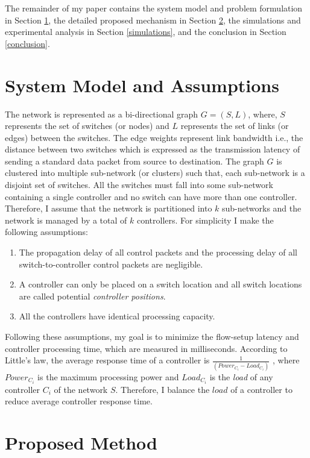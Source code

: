 \documentclass[journal]{IEEEtran}
\begin{document}
The remainder of my paper contains the system model and problem formulation in Section \ref{sysMod}, the detailed proposed mechanism in Section \ref{proposal}, the simulations and experimental analysis in Section \ref{simulations}, and the conclusion in Section \ref{conclusion}.

\section{System Model and Assumptions} \label{sysMod}
The network is represented as a bi-directional graph $G=(S,L)$, where, $S$ represents the set of switches (or nodes) and $L$ represents the set of links (or edges) between the switches. The edge weights represent link bandwidth i.e., the distance between two switches which is expressed as the transmission latency of sending a standard data packet from source to destination. The graph $G$ is clustered into multiple sub-network (or clusters) such that, each sub-network is a disjoint set of switches. All the switches must fall into some sub-network containing a single controller and no switch can have more than one controller. Therefore, I assume that the network is partitioned into $k$ sub-networks and the network is managed by a total of $k$ controllers. For simplicity I make the following assumptions:
\begin{enumerate}
	\item The propagation delay of all control packets and the processing delay of all switch-to-controller control packets are negligible.
	\item A controller can only be placed on a switch location and all switch locations are called potential \textit{controller positions}.
	\item All the controllers have identical processing capacity.
\end{enumerate}
Following these assumptions, my goal is to minimize the flow-setup latency and controller processing time, which are measured in milliseconds. According to Little's law, the average response time of a controller is $\frac{1}{(Power_{C_i} - Load_{C_i})}$ \cite{wang2016dynamic}, where $Power_{C_i}$ is the maximum processing power and $Load_{C_i}$ is the \textit{load} of any controller $C_i$ of the network $S$. Therefore, I balance the $load$ of a controller to reduce average controller response time.

\section{Proposed Method} \label{proposal}
\end{document}
